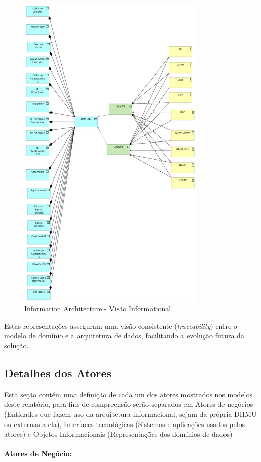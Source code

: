 \documentclass[12pt,a4paper,final]{article}
\begin{document}
    \begin{figure}[H]
        \centering
        \includegraphics[width=0.8\textwidth]{Q8 - Information Architecture - Informational}
        \caption{Information Architecture - Visão Informational}
        \label{fig:archi-info}
    \end{figure}

    Estas representações asseguram uma visão consistente
    (\emph{traceability}) entre o modelo de domínio e a arquitetura de dados,
    facilitando a evolução futura da solução.

    \subsection*{Detalhes dos Atores}\label{subsec:information-atores}

    Esta seção contém uma definição de cada um dos atores mostrados nos modelos deste relatório, para fins de compreensão serão separados em Atores de negócios (Entidades que fazem uso da arquitetura informacional, sejam da própria DHMU ou externas a ela), Interfaces tecnológicas (Sistemas e aplicações usados pelos atores) e Objetos Informacionais (Representações dos domínios de dados)
\\
    \\
\textbf{Atores de Negócio:}
\end{document}
